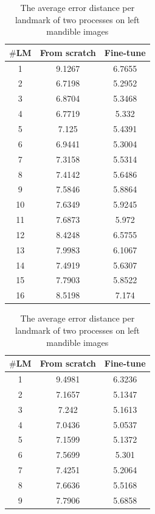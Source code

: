 \documentclass[review]{elsarticle}
\begin{document}
\begin{table}[htbp]
\begin{minipage}[t]{0.45\textwidth}
\centering
\begin{tabular}{|c|c|c|}
		\hline
		\textbf{$\#$LM} & \textbf{From scratch} & \textbf{Fine-tune} \\ \hline
		1 & 9.1267 & 6.7655 \\ \hline
		2 & 6.7198 & 5.2952 \\ \hline
		3 & 6.8704 & 5.3468 \\ \hline
		4 & 6.7719 & 5.332 \\ \hline
		5 & 7.125 & 5.4391 \\ \hline
		6 & 6.9441 & 5.3004 \\ \hline
		7 & 7.3158 & 5.5314 \\ \hline
		8 & 7.4142 & 5.6486 \\ \hline
		9 & 7.5846 & 5.8864 \\ \hline
		10 & 7.6349 & 5.9245 \\ \hline
		11 & 7.6873 & 5.972 \\ \hline
		12 & 8.4248 & 6.5755 \\ \hline
		13 & 7.9983 & 6.1067 \\ \hline
		14 & 7.4919 & 5.6307 \\ \hline
		15 & 7.7903 & 5.8522 \\ \hline
		16 & 8.5198 & 7.174 \\ \hline
	\end{tabular}
\caption{The average error distance per landmark of two processes on left mandible images}
\label{tblcmpmg}
\end{minipage}
\hfill
\begin{minipage}[t]{0.45\textwidth}
\centering
\begin{tabular}{|c|c|c|}
\hline
\textbf{$\#$LM} & \textbf{From scratch} & \textbf{Fine-tune} \\ \hline
		1 & 9.4981 & 6.3236 \\ \hline
	2 & 7.1657 & 5.1347 \\ \hline
	3 & 7.242 & 5.1613 \\ \hline
	4 & 7.0436 & 5.0537 \\ \hline
	5 & 7.1599 & 5.1372 \\ \hline
	6 & 7.5699 & 5.301 \\ \hline
	7 & 7.4251 & 5.2064 \\ \hline
	8 & 7.6636 & 5.5168 \\ \hline
	9 & 7.7906 & 5.6858 \\ \hline

\end{tabular}
\end{minipage}
\end{table}
\end{document}
